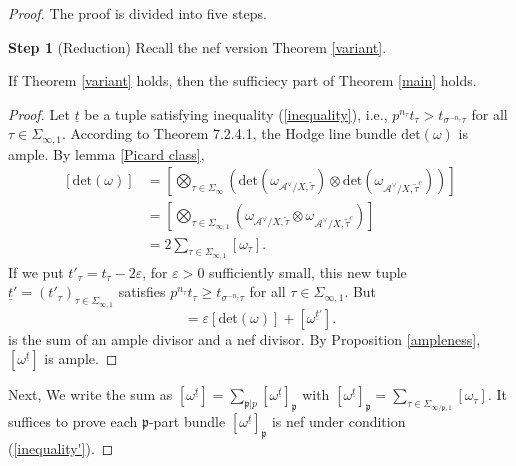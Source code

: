 \documentclass{article}
\begin{document}
\begin{proof} The proof is divided into five steps.

\medskip
\noindent
\textbf{Step 1} (Reduction) Recall the nef version Theorem \ref{variant}.

\begin{lemma}
If Theorem \ref{variant} holds, then the sufficiecy part of Theorem \ref{main} holds.
\begin{proof}
Let $\underline{t}$ be a tuple satisfying inequality (\ref{inequality}), i.e., $p^{n_\tau}t_\tau>t_{\sigma^{-n_\tau}\tau}$ for all $\tau\in\Sigma_{\infty,1}$. According to \citep{Lan} Theorem 7.2.4.1, the Hodge line bundle $\text{det}(\omega)$ is ample. By lemma \ref{Picard class},
\begin{equation}
\begin{aligned}
[\text{det}(\omega)] &=[\bigotimes_{\tau\in\Sigma_\infty}(\text{det}(\omega_{\mathcal{A}^\vee/X,\tilde\tau}) \otimes\text{det}(\omega_{\mathcal{A}^\vee/X,\tilde\tau^c}))]\\
&=[\bigotimes_{\tau\in\Sigma_{\infty,1}}(\omega_{\mathcal{A}^\vee/X,\tilde\tau}\otimes \omega_{\mathcal{A}^\vee/X,\tilde\tau^c})]\\
&=2\sum_{\tau\in\Sigma_{\infty,1}}[\omega_{\tau}].
\end{aligned}
\end{equation}
If we put $t'_\tau=t_\tau-2\varepsilon$, for $\varepsilon>0$ sufficiently small, this new tuple $\underline{t}'=(t'_\tau)_{\tau\in\Sigma_{\infty,1}}$ satisfies $p^{n_\tau}t_\tau\ge t_{\sigma^{-n_\tau}\tau}$ for all $\tau\in\Sigma_{\infty,1}$. But
\begin{equation}
[\omega^{\underline{t}}]=\varepsilon[\text{det}(\omega)]+[\omega^{\underline{t}'}].
\end{equation}
is the sum of an ample divisor and a nef divisor. By Proposition \ref{ampleness}, $[\omega^{\underline{t}}]$ is ample.
\end{proof}
\end{lemma}

Next, We write the sum as $[\omega^{\underline{t}}]=\sum_{\mathfrak{p}|p}[\omega^{\underline{t}}]_{\mathfrak{p}}$ with $[\omega^{\underline{t}}]_{\mathfrak{p}}=\sum_{\tau\in\Sigma_{\infty/\mathfrak{p},1}}[\omega_\tau]$. It suffices to prove each $\mathfrak{p}$-part bundle $[\omega^{\underline{t}}]_{\mathfrak{p}}$ is nef under condition (\ref{inequality'}).





\end{proof}
\end{document}
